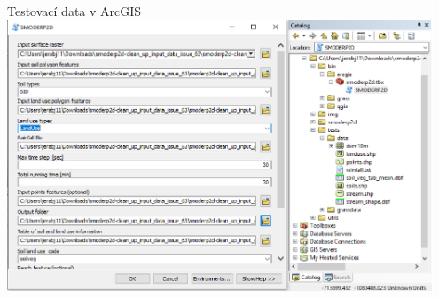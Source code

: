 \begin{frame}
    Testovací data v ArcGIS\vspace{1em}
    \includegraphics[width=0.95\textwidth]{obr/arcmap01.png}
\end{frame}
